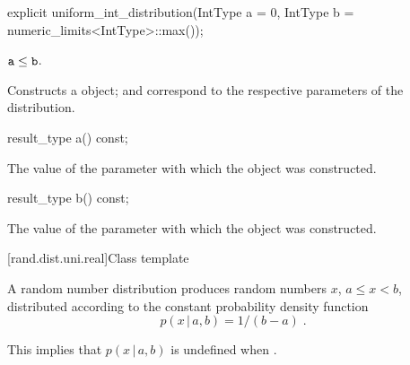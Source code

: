 %
\begin{itemdecl}
explicit uniform_int_distribution(IntType a = 0, IntType b = numeric_limits<IntType>::max());
\end{itemdecl}

\begin{itemdescr}
\pnum\requires
 $ \texttt{\protect a} \leq \texttt{\protect b} $.

\pnum\effects Constructs a  object;
  and 
 correspond to the respective parameters of the distribution.
\end{itemdescr}

%
\begin{itemdecl}
result_type a() const;
\end{itemdecl}

\begin{itemdescr}
\pnum\returns The value of the  parameter
 with which the object was constructed.
\end{itemdescr}

%
\begin{itemdecl}
result_type b() const;
\end{itemdecl}

\begin{itemdescr}
\pnum\returns The value of the  parameter
 with which the object was constructed.
\end{itemdescr}


[rand.dist.uni.real]{Class template }%
%
%

\pnum
A  random number distribution
produces random numbers $x$,
$ a \leq x < b $,
distributed according to
the constant probability density function%
%
%
\[%
 p(x\,|\,a,b) = 1 / (b - a)
\; \mbox{.}
\]
\begin{note}
This implies that $p(x\,|\,a,b)$ is undefined when .
\end{note}

